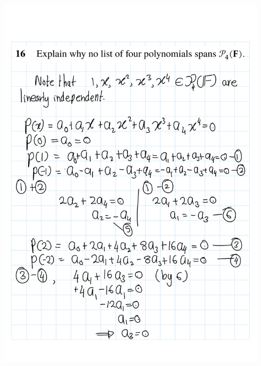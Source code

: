 \documentclass[
]{book}
\theoremstyle{definition}
\theoremstyle{definition}
\theoremstyle{definition}
\theoremstyle{definition}
\theoremstyle{remark}
\begin{document}
\includegraphics{fig/Ex2A/Ex2A-19.png}
\end{document}
